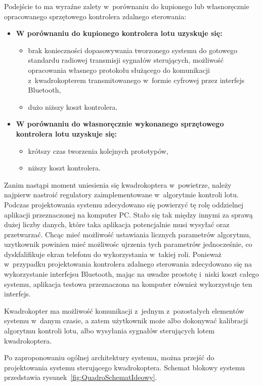 \documentclass[11pt, twoside]{Thesis} %
\begin{document}
Podejście to ma wyraźne zalety w~porównaniu do kupionego lub własnoręcznie opracowanego sprzętowego kontrolera zdalnego sterowania:

\begin{itemize}
	\item \textbf{W porównaniu do kupionego kontrolera lotu uzyskuje się:}
		\begin{itemize}
			\item brak konieczności dopasowywania tworzonego systemu do gotowego standardu radiowej transmisji sygnałów sterujących, możliwość opracowania własnego protokołu służącego do komunikacji z~kwadrokopterem transmitowanego w~formie cyfrowej przez interfejs Bluetooth,
			\item dużo niższy koszt kontrolera.
		\end{itemize}
	\item \textbf{W porównaniu do własnoręcznie wykonanego sprzętowego kontrolera lotu uzyskuje się:}
		\begin{itemize}
			\item krótszy czas tworzenia kolejnych prototypów,
			\item niższy koszt kontrolera.
		\end{itemize}
\end{itemize}

Zanim nastąpi moment uniesienia się kwadrokoptera w~powietrze, należy najpierw nastroić regulatory zaimplementowane w~algorytmie kontroli lotu. Podczas projektowania systemu zdecydowano się powierzyć tę rolę oddzielnej aplikacji przeznaczonej na komputer PC. Stało się tak między innymi za sprawą dużej liczby danych, które taka aplikacja potencjalnie musi wysyłać oraz przetwarzać. Chcąc mieć możliwość ustawiania licznych parametrów algorytmu, uzytkownik powinien mieć możliwośc ujrzenia tych parametrów jednocześnie, co dyskfalifikuje ekran telefonu do wykorzystania w~takiej roli. Ponieważ w~przypadku projektowania kontrolera zdalnego sterowania zdecydowano się na wykorzystanie interfejsu Bluetooth, mając na uwadze prostotę i~niski koszt całego systemu, aplikacja testowa przeznaczona na komputer również wykorzystuje ten interfejs.

Kwadrokopter ma możliwość komunikacji z~jednym z~pozostałych elementów systemu w~danym czasie, a zatem użytkownik może albo dokonywać kalibracji algorytmu kontroli lotu, albo wysyłania sygnałów sterujących lotem kwadrokoptera.

Po zaproponowaniu ogólnej architektury systemu, można przejść do projektowania systemu sterującego kwadrokoptera. Schemat blokowy systemu przedstawia rysunek~\ref{fig:QuadroSchematIdeowy}.
\end{document}
